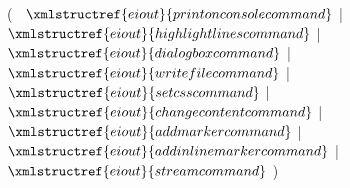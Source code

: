 ( 
$~$ $\xmlstructref{eiout}{printonconsolecommand}$ 
| $\xmlstructref{eiout}{highlightlinescommand}$ 
| $\xmlstructref{eiout}{dialogboxcommand}$ 
| $\xmlstructref{eiout}{writefilecommand}$ 
| $\xmlstructref{eiout}{setcsscommand}$
| $\xmlstructref{eiout}{changecontentcommand}$
| $\xmlstructref{eiout}{addmarkercommand}$
| $\xmlstructref{eiout}{addinlinemarkercommand}$
| $\xmlstructref{eiout}{streamcommand}$
)
